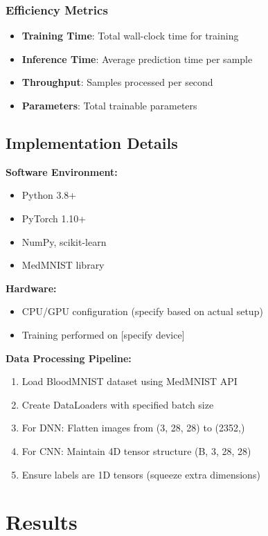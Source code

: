 \documentclass[runningheads]{llncs}
\begin{document}
\subsubsection{Efficiency Metrics}

\begin{itemize}
    \item \textbf{Training Time}: Total wall-clock time for training
    \item \textbf{Inference Time}: Average prediction time per sample
    \item \textbf{Throughput}: Samples processed per second
    \item \textbf{Parameters}: Total trainable parameters
\end{itemize}

\subsection{Implementation Details}

\textbf{Software Environment:}
\begin{itemize}
    \item Python 3.8+
    \item PyTorch 1.10+
    \item NumPy, scikit-learn
    \item MedMNIST library
\end{itemize}

\textbf{Hardware:}
\begin{itemize}
    \item CPU/GPU configuration (specify based on actual setup)
    \item Training performed on [specify device]
\end{itemize}

\textbf{Data Processing Pipeline:}
\begin{enumerate}
    \item Load BloodMNIST dataset using MedMNIST API
    \item Create DataLoaders with specified batch size
    \item For DNN: Flatten images from (3, 28, 28) to (2352,)
    \item For CNN: Maintain 4D tensor structure (B, 3, 28, 28)
    \item Ensure labels are 1D tensors (squeeze extra dimensions)
\end{enumerate}

\section{Results}
\end{document}
